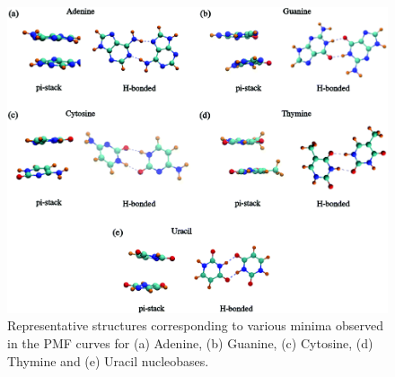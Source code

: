     \begin{figure}
        \centering
        \includegraphics[width=\textwidth]{Chapter1/Figures/Figure6.png}
        \caption[Representative structures corresponding to various minima observed in the PMF curves for Adenine, Guanine, Cytosine, Thymine and Uracil nucleobases.]{Representative structures corresponding to various minima observed in the PMF curves for (a) Adenine, (b) Guanine, (c) Cytosine, (d) Thymine and (e) Uracil nucleobases.}
    \end{figure}

